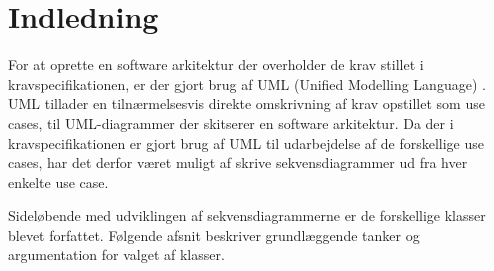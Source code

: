 \documentclass[softwarearkitektur.tex]{subfiles}
\begin{document}
\section{Indledning}
For at oprette en software arkitektur der overholder de krav stillet i kravspecifikationen, er der gjort brug af UML (Unified Modelling Language) \cite{UMLurl}. UML tillader en tilnærmelsesvis direkte omskrivning af krav opstillet som use cases, til UML-diagrammer der skitserer en software arkitektur. 
Da der i kravspecifikationen er gjort brug af UML til udarbejdelse af de forskellige use cases, har det derfor været muligt af skrive sekvensdiagrammer ud fra hver enkelte use case. 

Sideløbende med udviklingen af sekvensdiagrammerne er de forskellige klasser blevet forfattet. Følgende afsnit beskriver grundlæggende tanker og argumentation for valget af klasser.
\end{document}
